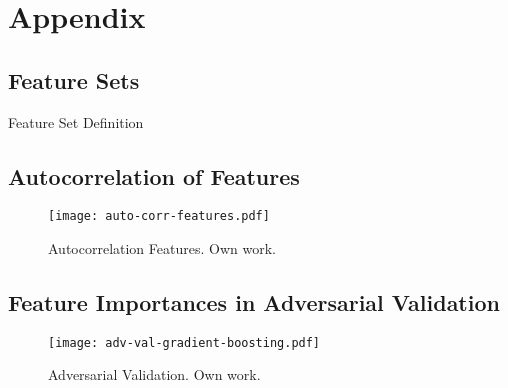 \section{Appendix}


\subsection{Feature Sets}
\label{app:feature-sets}

\begin{table}[H]
    \centering
    
    \caption[Feature Set Definition]{Feature Set Definition}
    \label{tab:feature-set-definition}
\end{table}

\newpage

\subsection{Autocorrelation of Features}
\label{app:autocorrelation-of-features}

\begin{figure}[ht]
    \centering
    \texttt{[image: auto-corr-features.pdf]}
    \caption[Autocorrelation Features]{Autocorrelation Features. Own work.}
    \label{fig:auto-correlation-features}
\end{figure}

\newpage
\subsection{Feature Importances in Adversarial Validation}
\label{app:feature-importances-adv-validation}
\begin{figure}[ht]
    \centering
    \texttt{[image: adv-val-gradient-boosting.pdf]}
    \caption[Adversarial Validation]{Adversarial Validation. Own work.}
    \label{fig:adv-validation}
\end{figure}